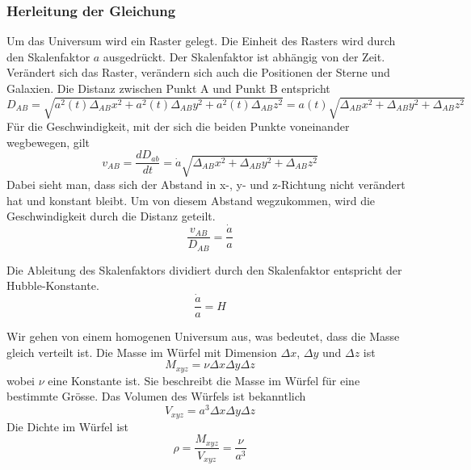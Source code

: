 \begin{refsection}
\subsubsection{Herleitung der Gleichung}
Um das Universum wird ein Raster gelegt. Die Einheit des Rasters wird durch den Skalenfaktor $a$ ausgedrückt. Der Skalenfaktor ist abhängig von der Zeit. Verändert sich das Raster, verändern sich auch die Positionen der Sterne und Galaxien.
Die Distanz zwischen Punkt A und Punkt B entspricht 
\begin{equation}
D_{AB} = \sqrt{a^2(t)\Delta_{AB}x^2 + a^2(t)\Delta_{AB}y^2 + a^2(t)\Delta_{AB}z^2} = a(t) \sqrt{\Delta_{AB}x^2 + \Delta_{AB}y^2 + \Delta_{AB}z^2}
\end{equation}
F\"{u}r die Geschwindigkeit, mit der sich die beiden Punkte voneinander wegbewegen, gilt 
\begin{equation}
v_{AB} = \dfrac{dD_{ab}}{dt} 
	   = \dot{a} \sqrt{\Delta_{AB}x^2 + \Delta_{AB}y^2 + \Delta_{AB}z^2}
\end{equation}
Dabei sieht man, dass sich der Abstand in x-, y- und z-Richtung nicht ver\"{a}ndert hat und konstant bleibt. Um von diesem Abstand wegzukommen, wird die Geschwindigkeit durch die Distanz geteilt.
\begin{equation}
\frac{v_{AB} }{D_{AB}} = \frac{\dot{a}}{a}
\label{friedmann:geschwindigkeit}
\end{equation}
\begin{satz} 
	Die Ableitung des Skalenfaktors dividiert durch den Skalenfaktor entspricht der Hubble-Konstante.
	\[
	\frac{\dot{a}}{a} = H
	\]
\end{satz}
Wir gehen von einem homogenen Universum aus, was bedeutet, dass die Masse gleich verteilt ist. Die Masse im Würfel mit Dimension $\Delta x$, $\Delta y$ und $\Delta z$ ist 
\begin{equation}
M_{xyz} = \nu \Delta x \Delta y \Delta z
\end{equation}
wobei $\nu$ eine Konstante ist. Sie beschreibt die Masse im Würfel für eine bestimmte Grösse. Das Volumen des Würfels ist bekanntlich 
\begin{equation}
V_{xyz} = a^3 \Delta x \Delta y \Delta z
\end{equation}
Die Dichte im Würfel ist  
\begin{equation}
\rho = \frac{M_{xyz}}{V_{xyz}} = \frac{\nu}{a^3}
\label{friedmann:dichte}
\end{equation}

\end{refsection}

